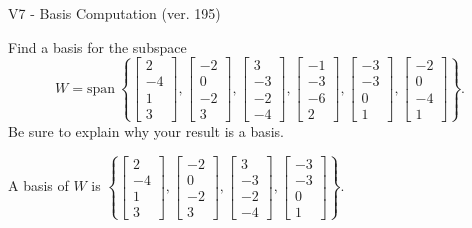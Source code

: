\begin{exercise}
  \begin{exerciseTitle}V7 - Basis Computation (ver. 195)\end{exerciseTitle}
  \begin{exerciseStatement}
    Find a basis for the subspace 
\[W=\mathrm{span}\ \left\{\left[\begin{array}{r}
2 \\
-4 \\
1 \\
3
\end{array}\right] , \left[\begin{array}{r}
-2 \\
0 \\
-2 \\
3
\end{array}\right] , \left[\begin{array}{r}
3 \\
-3 \\
-2 \\
-4
\end{array}\right] , \left[\begin{array}{r}
-1 \\
-3 \\
-6 \\
2
\end{array}\right] , \left[\begin{array}{r}
-3 \\
-3 \\
0 \\
1
\end{array}\right] , \left[\begin{array}{r}
-2 \\
0 \\
-4 \\
1
\end{array}\right]\right\}.\]
 Be sure to explain why your result is a basis.


  \end{exerciseStatement}
  \begin{exerciseAnswer}
   A basis of \(W\) is  \(\left\{\left[\begin{array}{r}
2 \\
-4 \\
1 \\
3
\end{array}\right] , \left[\begin{array}{r}
-2 \\
0 \\
-2 \\
3
\end{array}\right] , \left[\begin{array}{r}
3 \\
-3 \\
-2 \\
-4
\end{array}\right] , \left[\begin{array}{r}
-3 \\
-3 \\
0 \\
1
\end{array}\right]\right\}\).
  


  \end{exerciseAnswer}
\end{exercise}